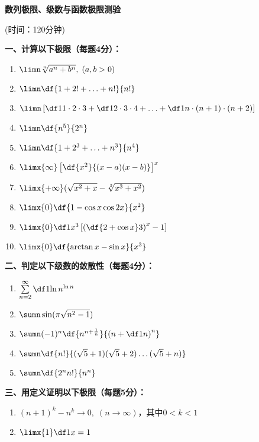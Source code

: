 \begin{center}
	{\Large\bf 数列极限、级数与函数极限测验}
	
	(时间：120分钟)
\end{center}

{\bf 一、计算以下极限（每题4分）：}
\begin{enumerate}[(1)]
  \setlength{\itemindent}{1cm}
  \item $\limn\sqrt[n]{a^n+b^n},\;(a,b>0)$
  \item $\limn\df{1+2!+\ldots+n!}{n!}$
  \item $\limn\left[\df1{1\cdot 2\cdot 3}+\df1{2\cdot 3\cdot 4}+\ldots+
  \df1{n\cdot (n+1)\cdot (n+2)}\right]$
  \item $\limn\df{n^5}{2^n}$
  \item $\limn\df{1+2^3+\ldots+n^3}{n^4}$
  \item $\limx{\infty}\left[\df{x^2}{(x-a)(x-b)}\right]^x$
  \item $\limx{+\infty}(\sqrt{x^2+x}-\sqrt[3]{x^3+x^2})$ 
  \item $\limx{0}\df{1-\cos x\cos 2x}{x^2}$
  \item $\limx{0}\df1{x^3}\left[\left(\df{2+\cos x}3\right)^x-1\right]$
  \item $\limx{0}\df{\arctan x-\sin x}{x^3}$
\end{enumerate}

{\bf 二、判定以下级数的敛散性（每题4分）：}
\begin{enumerate}[(1)]
  \setlength{\itemindent}{1cm}
  \item $\sum\limits_{n=2}^{\infty}\df1{\ln n^{\ln n}}$
  \item $\sumn\sin(\pi\sqrt{n^2-1})$
  \item $\sumn(-1)^n\df{n^{n+\frac1n}}{\left(n+\df1n\right)^n}$
  \item $\sumn\df{n!}{{(\sqrt5+1)}{(\sqrt5+2)}\ldots{(\sqrt5+n)}}$
  \item $\sumn\df{2^nn!}{n^n}$
\end{enumerate}

{\bf 三、用定义证明以下极限（每题5分）：}
\begin{enumerate}[(1)]
  \setlength{\itemindent}{1cm}
  \item $(n+1)^k-n^k\to 0,\;(n\to\infty)$，其中$0<k<1$
  \item $\limx{1}\df1{x}=1$
\end{enumerate}

